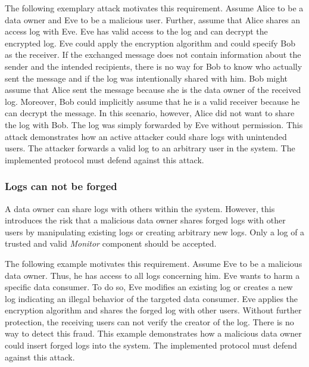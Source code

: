 \documentclass[../main.tex]{subfiles}
\begin{document}
The following exemplary attack motivates this requirement.
Assume Alice to be a data owner and Eve to be a malicious user.
Further, assume that Alice shares an access log with Eve.
Eve has valid access to the log and can decrypt the encrypted log.
Eve could apply the encryption algorithm and could specify Bob as the receiver.
If the exchanged message does not contain information about the sender and the intended recipients, there is no way for Bob to know who actually sent the message and if the log was intentionally shared with him.
Bob might assume that Alice sent the message because she is the data owner of the received log.
Moreover, Bob could implicitly assume that he is a valid receiver because he can decrypt the message.
In this scenario, however, Alice did not want to share the log with Bob.
The log was simply forwarded by Eve without permission.
This attack demonstrates how an active attacker could share logs with unintended users.
The attacker forwards a valid log to an arbitrary user in the system.
The implemented protocol must defend against this attack.

\subsubsection{Logs can not be forged}

A data owner can share logs with others within the system.
However, this introduces the risk that a malicious data owner shares forged logs with other users by manipulating existing logs or creating arbitrary new logs.
Only a log of a trusted and valid \emph{Monitor} component should be accepted.

The following example motivates this requirement.
Assume Eve to be a malicious data owner.
Thus, he has access to all logs concerning him.
Eve wants to harm a specific data consumer.
To do so, Eve modifies an existing log or creates a new log indicating an illegal behavior of the targeted data consumer.
Eve applies the encryption algorithm and shares the forged log with other users.
Without further protection, the receiving users can not verify the creator of the log.
There is no way to detect this fraud.
This example demonstrates how a malicious data owner could insert forged logs into the system.
The implemented protocol must defend against this attack.
\end{document}
